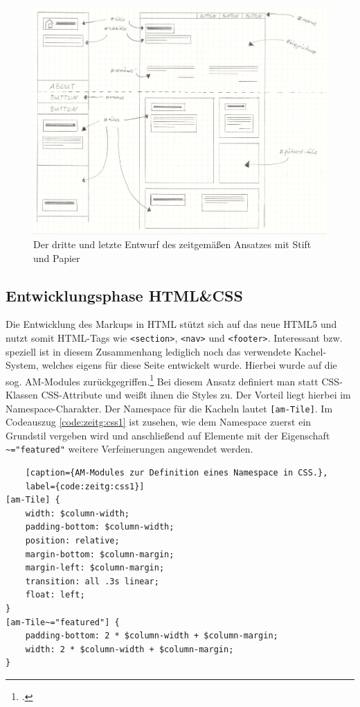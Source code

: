 \begin{figure} [hp]
	\includegraphics[width=\textwidth]{./img/zeitg_comp3.jpg}
	\caption{Der dritte und letzte Entwurf des zeitgemäßen Ansatzes mit Stift und Papier}
	\label{zeitg:Comp3}
\end{figure}

\subsection{Entwicklungsphase HTML\&CSS}
Die Entwicklung des Markups in HTML stützt sich auf das neue HTML5 und nutzt somit HTML-Tags wie \lstinline{<section>}, \lstinline{<nav>} und \lstinline{<footer>}.
Interessant bzw. speziell ist in diesem Zusammenhang lediglich noch das verwendete Kachel-System, welches eigens für diese Seite entwickelt wurde. Hierbei wurde auf die sog. AM-Modules zurückgegriffen.\footcite[vgl.][]{glen:am} Bei diesem Ansatz definiert man statt CSS-Klassen CSS-Attribute und weißt ihnen die Styles zu. Der Vorteil liegt hierbei im Namespace-Charakter. Der Namespace für die Kacheln lautet \lstinline{[am-Tile]}. Im Codeauszug \ref{code:zeitg:css1} ist zusehen, wie dem Namespace zuerst ein Grundstil vergeben wird und anschließend auf Elemente mit der Eigenschaft \lstinline{~="featured"} weitere Verfeinerungen angewendet werden.

\begin{lstlisting}
	[caption={AM-Modules zur Definition eines Namespace in CSS.},
	label={code:zeitg:css1}]
[am-Tile] {
	width: $column-width;
	padding-bottom: $column-width;
	position: relative;
	margin-bottom: $column-margin;
	margin-left: $column-margin;
	transition: all .3s linear;
	float: left;
}
[am-Tile~="featured"] {
	padding-bottom: 2 * $column-width + $column-margin;
	width: 2 * $column-width + $column-margin;
}
\end{lstlisting}

